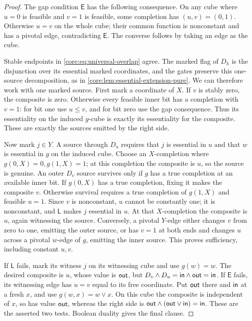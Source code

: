 \begin{proof}
The gap condition $\mathsf E$ has the following consequence. On any cube
where $u=0$ is feasible and $v=1$ is feasible, some completion has
$(u,v)=(0,1)$. Otherwise $u=v$ on the whole cube; their common function
is nonconstant and has a pivotal edge, contradicting $\mathsf E$.
The converse follows by taking an edge as the cube.

Stable endpoints in \eqref{core:eq:universal-overlap} agree. The marked
flag of $D_h$ is the disjunction over its essential marked coordinates,
and the gates preserve this one-source decomposition, as in
\cref{core:lem:essential-extension-pure}. We can therefore work with
one marked source. First mark a coordinate of $X$. If $v$ is stably zero,
the composite is zero. Otherwise every feasible inner bit has a
completion with $v=1$: for bit one use $u\leq v$, and for bit zero use
the gap consequence. Thus its essentiality on the induced $g$-cube is
exactly its essentiality for the composite. These are exactly the
sources emitted by the right side.

Now mark $j\in Y$. A source through $D_u$ requires that $j$ is essential
in $u$ and that $w$ is essential in $g$ on the induced cube.
Choose an $X$-completion where $g(0,X)=0,g(1,X)=1$; at this completion
the composite is $u$, so the source is genuine. An outer $D_v$ source
survives only if $g$ has a true completion at an available inner bit.
If $g(0,X)$ has a true completion, fixing it makes the composite $v$.
Otherwise survival requires a true completion of $g(1,X)$ and feasible
$u=1$. Since $v$ is nonconstant, $u$ cannot be constantly one; it is
nonconstant, and $\mathsf L$ makes $j$ essential in $u$.
At that $X$-completion the composite is $u$, again witnessing the source.
Conversely, a pivotal $Y$-edge either changes $v$ from zero to one,
emitting the outer source, or has $v=1$ at both ends and changes $u$
across a pivotal $w$-edge of $g$, emitting the inner source.
This proves sufficiency, including constant $u,v$.

If $\mathsf L$ fails, mark its witness $j$ on its witnessing cube and
use $g(w)=w$. The desired composite is $u$, whose value is $\mathsf{out}$,
but $D_v\wedge D_u=\mathsf{in}\wedge\mathsf{out}=\mathsf{in}$.
If $\mathsf E$ fails, its witnessing edge has $u=v$ equal to its free
coordinate. Put $\mathsf{out}$ there and $\mathsf{in}$ at a fresh $x$, and use
$g(w,x)=w\vee x$. On this cube the composite is independent of $x$,
so has value $\mathsf{out}$, whereas the right side is
$\mathsf{out}\wedge(\mathsf{out}\vee\mathsf{in})=\mathsf{in}$.
These are the asserted two tests. Boolean duality gives the final clause.
\end{proof}

